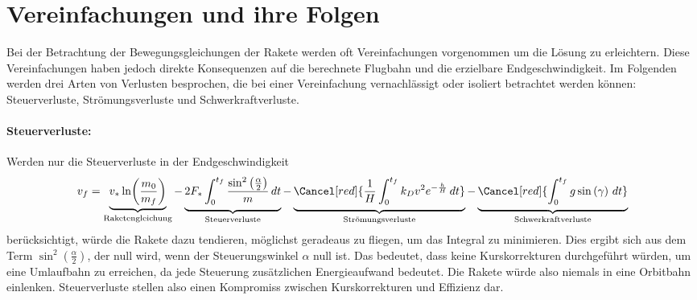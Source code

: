 %
%
%
%

\section{Vereinfachungen und ihre Folgen 
	\label{leo:section:vereinfachungen}}

Bei der Betrachtung der Bewegungsgleichungen der Rakete werden oft Vereinfachungen vorgenommen um die Lösung zu erleichtern. 
Diese Vereinfachungen haben jedoch direkte Konsequenzen auf die berechnete Flugbahn und die erzielbare Endgeschwindigkeit. 
Im Folgenden werden drei Arten von Verlusten besprochen, die bei einer Vereinfachung vernachlässigt oder isoliert betrachtet werden können: Steuerverluste, Strömungsverluste und Schwerkraftverluste.


\paragraph{Steuerverluste:}Werden nur die Steuerverluste in der Endgeschwindigkeit
\begin{equation*}
v_f
=
\underbrace{v_* \ln \biggl(\frac{m_0}{m_f}\biggr)}_{\text{Raketengleichung}} 
-
\underbrace{2F_* \int_{0\mathstrut}^{t_f} \frac{\sin^2\left(\frac{\alpha}{2}\right)}{m} \, dt }_{\text{Steuerverluste}}
-
\underbrace{\Cancel[red]{\frac{1}{H} \int_{0\mathstrut}^{t_f} k_Dv^2 e^{-\frac{h}{H}} \, dt }}_{\text{Strömungsverluste}}
-
\underbrace{\Cancel[red]{\int_{0\mathstrut}^{t_f} g \sin \left(\gamma\right) \, dt}}_{\text{Schwerkraftverluste}}
\end{equation*}
berücksichtigt, würde die Rakete dazu tendieren, möglichst geradeaus zu fliegen, um das Integral zu minimieren. 
Dies ergibt sich aus dem Term $\sin^2\left( \frac{\alpha}{2}\right)$, der null wird, wenn der Steuerungswinkel $\alpha$ null ist. 
Das bedeutet, dass keine Kurskorrekturen durchgeführt würden, um eine Umlaufbahn zu erreichen, da jede Steuerung zusätzlichen Energieaufwand bedeutet. 
Die Rakete würde also niemals in eine Orbitbahn einlenken.
Steuerverluste stellen also einen Kompromiss zwischen Kurskorrekturen und Effizienz dar.

